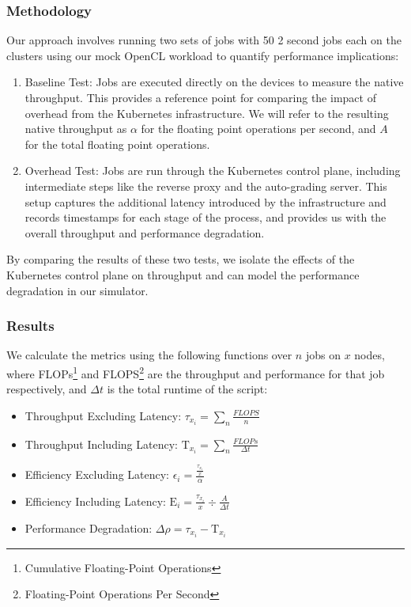 \documentclass[acmlarge]{acmart}
\begin{document}
\subsubsection{Methodology}

Our approach involves running two sets of jobs with 50 2 second jobs each on the clusters using our mock OpenCL workload to quantify performance implications:

\begin{enumerate}
    \item Baseline Test: Jobs are executed directly on the devices to measure the native throughput. This provides a reference point for comparing the impact of overhead from the Kubernetes infrastructure. We will refer to the resulting native throughput as $\alpha$ for the floating point operations per second, and $A$ for the total floating point operations.
    \item Overhead Test: Jobs are run through the Kubernetes control plane, including intermediate steps like the reverse proxy and the auto-grading server. This setup captures the additional latency introduced by the infrastructure and records timestamps for each stage of the process, and provides us with the overall throughput and performance degradation.
\end{enumerate}

By comparing the results of these two tests, we isolate the effects of the Kubernetes control plane on throughput and can model the performance degradation in our simulator.

\subsubsection{Results}

We calculate the metrics using the following functions over $n$ jobs on $x$ nodes, where FLOPs\footnote{Cumulative Floating-Point Operations} and FLOPS\footnote{Floating-Point Operations Per Second} are the throughput and performance for that job respectively, and $\Delta t$ is the total runtime of the script:

\begin{itemize}
    \item Throughput Excluding Latency: $\tau_{x_i} = \sum_{n}^{} \frac{FLOPS}{n}$
    \item Throughput Including Latency: $\mathrm{T}_{x_i} = \sum_{n}^{} \frac{FLOPs}{\Delta t}$
    \item Efficiency Excluding Latency: $\epsilon_i = \frac{\frac{\tau_{x_i}}{x}}{\alpha}$
    \item Efficiency Including Latency: $\mathrm{E}_i = \frac{\tau_{x_i}}{x} \div \frac{A}{\Delta t}$
    \item Performance Degradation: $\Delta \rho = \tau_{x_i} - \mathrm{T}_{x_i}$
\end{itemize}
\end{document}
